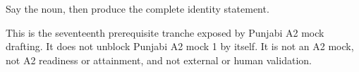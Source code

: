 \begin{tcolorbox}[breakable,colback=teal!4,colframe=teal!35!black,title={Before you move on}]
Say the noun, then produce the complete identity statement.

This is the seventeenth prerequisite tranche exposed by Punjabi A2 mock drafting. It does not unblock Punjabi A2 mock 1 by itself. It is not an A2 mock, not A2 readiness or attainment, and not external or human validation.
\end{tcolorbox}
